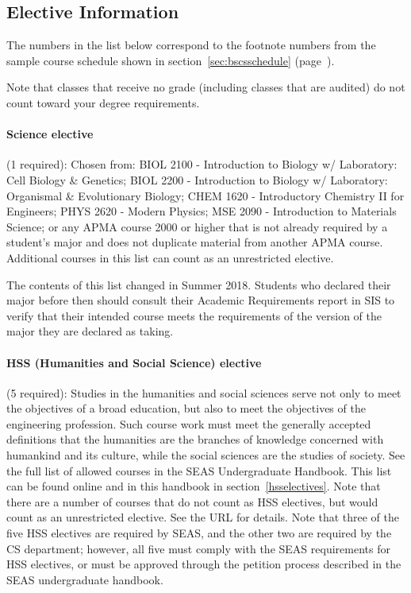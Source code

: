 \subsection{Elective Information}
\label{sec:electiveinfo}

The numbers in the list below correspond to the footnote numbers from
the sample course schedule shown in section~\ref{sec:bscsschedule}
(page~\pageref{sec:bscsschedule}).

Note that classes that receive no grade (including classes that are
audited) do not count toward your degree requirements.

\paragraph{Science elective} (1 required): Chosen from:
  BIOL 2100 - Introduction to Biology w/ Laboratory: Cell Biology & Genetics; BIOL 2200 - Introduction to Biology w/ Laboratory: Organismal & Evolutionary Biology;
  CHEM 1620 - Introductory Chemistry II for Engineers;
  PHYS 2620 - Modern Physics;
  MSE 2090 - Introduction to Materials Science;
  or any APMA course 2000 or higher that is not already required by a student’s major and does not duplicate material from another APMA course.
  Additional courses in this list can count as an unrestricted
  elective.
  
  The contents of this list changed in Summer 2018. Students who declared their major before then should consult their Academic Requirements report in SIS to verify that their intended course meets the requirements of the version of the major they are declared as taking.

\paragraph{HSS (Humanities and Social Science) elective} (5 required): 
  Studies in the humanities and social sciences serve not only to meet
  the objectives of a broad education, but also to meet the objectives
  of the engineering profession. Such course work must meet the
  generally accepted definitions that the humanities are the branches
  of knowledge concerned with humankind and its culture, while the
  social sciences are the studies of society. See the full list of
  allowed courses in the SEAS Undergraduate Handbook. This list can be
  found
  online
  and in this handbook in section~\ref{hsselectives}. Note that there
  are a number of courses that do not count as HSS electives, but
  would count as an unrestricted elective. See the URL for details.
  Note that three of the five HSS electives are required by SEAS, and
  the other two are required by the CS department; however, all five
  must comply with the SEAS requirements for HSS electives, or must be
  approved through the petition process described in the SEAS
  undergraduate handbook.


